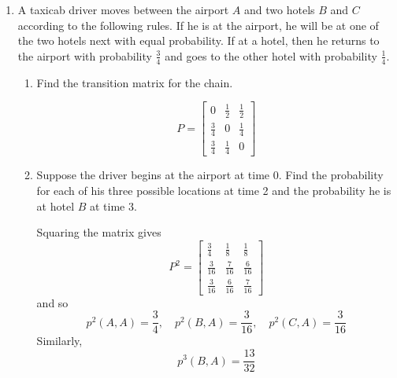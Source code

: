 \documentclass[10pt, oneside]{article}
\theoremstyle{definition}
\begin{document}
\begin{enumerate}
    \item A taxicab driver moves between the airport $A$ and two hotels $B$ and $C$ according to the following rules. If he is at the airport, he will be at one of the two hotels next with equal probability. If at a hotel, then he returns to the airport with probability $\frac{3}{4}$ and goes to the other hotel with probability $\frac{1}{4}$.
    \begin{enumerate}
        \item Find the transition matrix for the chain.
        \begin{solution}
        \[
            P = \begin{bmatrix}
                0 & \frac{1}{2} & \frac{1}{2}\\
                \frac{3}{4} & 0 & \frac{1}{4}\\
                \frac{3}{4} & \frac{1}{4} & 0
            \end{bmatrix}\]
        \end{solution}
        \item Suppose the driver begins at the airport at time 0. Find the probability for each of his three possible locations at time 2 and the probability he is at hotel $B$ at time 3.
        \begin{solution}
        Squaring the matrix gives
                \[P^2 = \begin{bmatrix}
                    \frac{3}{4} & \frac{1}{8} & \frac{1}{8}\\
                    \frac{3}{16} & \frac{7}{16} & \frac{6}{16}\\
                    \frac{3}{16} & \frac{6}{16} & \frac{7}{16}
                \end{bmatrix}\]
                and so 
                \[p^2(A,A) = \frac{3}{4}, \quad p^2(B,A) = \frac{3}{16}, \quad p^2(C,A) = \frac{3}{16}\]
            Similarly, 
            \[p^3(B,A) = \frac{13}{32}\]
        \end{solution}
    \end{enumerate}


\end{enumerate}
\end{document}
